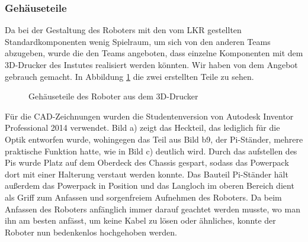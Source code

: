 \documentclass[12pt,a4paper,oneside]{article}
\begin{document}
\begin{spacing}{1.15}
\subsubsection{Gehäuseteile}
Da bei der Gestaltung des Roboters mit den vom LKR gestellten Standardkomponenten wenig Spielraum, um sich von den anderen Teams abzugeben, wurde die den Teams angeboten, dass einzelne Komponenten mit dem 3D-Drucker des Instutes realisiert werden könnten. Wir haben von dem Angebot gebrauch gemacht. In Abbildung \ref{fig:Gehäuseteile} die zwei erstellten Teile zu sehen. 
\begin{center}
	\begin{figure}[h]
		\centering
		\hspace{0.5cm}
		\hspace{0.5cm}
		\caption{Gehäuseteile des Roboter aus dem 3D-Drucker}
		\label{fig:Gehäuseteile}
	\end{figure}
\end{center}
Für die CAD-Zeichnungen wurden die Studentenversion von Autodesk Inventor Professional 2014 verwendet. Bild a) zeigt das Heckteil, das lediglich für die Optik entworfen wurde, wohingegen das Teil aus Bild b9, der Pi-Ständer, mehrere  praktische Funktion hatte, wie in Bild c) deutlich wird. Durch das aufstellen des Pis wurde Platz auf dem Oberdeck des Chassis gespart, sodass das Powerpack dort mit einer Halterung verstaut werden konnte. Das Bauteil Pi-Ständer hält außerdem das Powerpack in Position und das Langloch im oberen Bereich dient als Griff zum Anfassen und sorgenfreiem Aufnehmen des Roboters. Da beim Anfassen des Roboters anfänglich immer darauf geachtet werden musste, wo man ihn am besten anfässt, um keine Kabel zu lösen oder ähnliches, konnte der Roboter nun bedenkenlos hochgehoben werden.  



\end{spacing}
\end{document}
